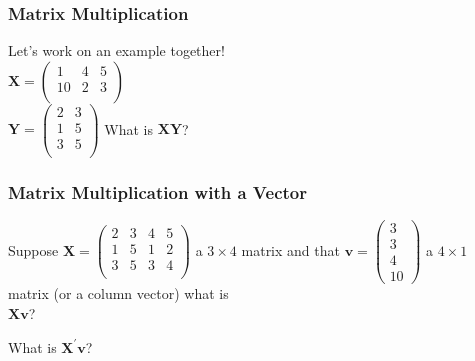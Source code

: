 \documentclass[handout]{beamer}
\numberwithin{equation}{section}
\begin{document}
\begin{frame}
\frametitle{Matrix Multiplication}

Let's work on an example together!\\
$\boldsymbol{X} = \begin{pmatrix} 1 & 4 & 5 \\
													10 & 2 & 3 \\
							\end{pmatrix} 						$													\\
$\boldsymbol{Y} = \begin{pmatrix} 2 & 3 \\
													1 & 5 \\
													3 & 5\\
							\end{pmatrix} 				$
What is $\boldsymbol{X} \boldsymbol{Y} $?


\pause 


\end{frame}



\begin{frame}
\frametitle{Matrix Multiplication with a Vector} 

Suppose $\boldsymbol{X} = \begin{pmatrix} 2 & 3 & 4 & 5 \\
													1 & 5 & 1 & 2\\
													3 & 5 & 3 & 4 \\
							\end{pmatrix} 	$ a $3 \times 4$ matrix and that $\boldsymbol{v}  = \begin{pmatrix} 3\\ 3 \\ 4 \\ 10 \end{pmatrix} $ a $4 \times 1$ matrix (or a column vector) what is \\
$\boldsymbol{X} \boldsymbol{v}$?


What is $\boldsymbol{X}^{'} \boldsymbol{v}$?

\end{frame}
\end{document}

